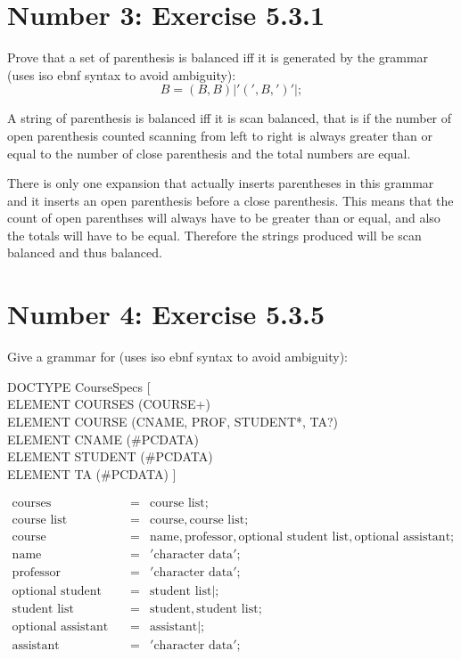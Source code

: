 \documentclass[12pt,a4paper,twoside]{article}  %
\begin{document}
\section{Number 3: Exercise 5.3.1}

Prove that a set of parenthesis is balanced iff it is generated by the
grammar (uses iso ebnf syntax to avoid ambiguity):
\begin{equation}
B = (B, B) | '(', B, ')' | ;
\end{equation}

A string of parenthesis is balanced iff it is scan balanced, that is
if the number of open parenthesis counted scanning from left to right
is always greater than or equal to the number of close parenthesis and
the total numbers are equal.

There is only one expansion that actually inserts parentheses in this
grammar and it inserts an open parenthesis before a close
parenthesis. This means that the count of open parenthses will always
have to be greater than or equal, and also the totals will have to be
equal. Therefore the strings produced will be scan balanced and thus
balanced.

\section{Number 4: Exercise 5.3.5}

Give a grammar for (uses iso ebnf syntax to avoid ambiguity):

DOCTYPE CourseSpecs [ \\
  ELEMENT COURSES (COURSE+) \\
  ELEMENT COURSE (CNAME, PROF, STUDENT*, TA?) \\
  ELEMENT CNAME (\#PCDATA) \\
  ELEMENT STUDENT (\#PCDATA) \\
  ELEMENT TA (\#PCDATA) ]

\begin{eqnarray}
\textrm{courses}               &=& \textrm{course list}; \\
\textrm{course list}           &=& \textrm{course}, \textrm{course list}; \\
\textrm{course}                &=& \textrm{name}, \textrm{professor},
                                    \textrm{optional student list},
                                    \textrm{optional assistant}; \\
\textrm{name}                  &=& '\textrm{character data}'; \\
\textrm{professor}             &=& '\textrm{character data}'; \\
\textrm{optional student list} &=& \textrm{student list} | ; \\
\textrm{student list}          &=& \textrm{student}, \textrm{student list}; \\
\textrm{optional assistant}    &=& \textrm{assistant} | ; \\
\textrm{assistant}             &=& '\textrm{character data}';
\end{eqnarray}
\end{document}
